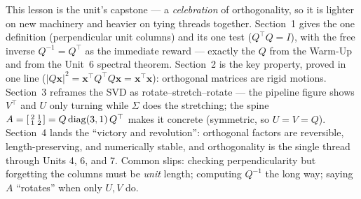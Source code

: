 \documentclass[10pt]{article}
\newcommand{\xx}{\mathbf{x}}
\newcommand{\T}{^{\top}}
\begin{document}
\begin{teachernote}
This lesson is the unit's capstone --- a \emph{celebration} of orthogonality, so it is lighter on new machinery
and heavier on tying threads together. Section~1 gives the one definition (perpendicular unit columns) and its
one test ($Q\T Q=I$), with the free inverse $Q^{-1}=Q\T$ as the immediate reward --- exactly the $Q$ from the
Warm-Up and from the Unit~6 spectral theorem. Section~2 is the key property, proved in one line
($|Q\xx|^2=\xx\T Q\T Q\xx=\xx\T\xx$): orthogonal matrices are rigid motions. Section~3 reframes the SVD as
rotate--stretch--rotate --- the pipeline figure shows $V\T$ and $U$ only turning while $\Sigma$ does the
stretching; the spine $A=\begin{bsmallmatrix} 2 & 1\\ 1 & 2 \end{bsmallmatrix}=Q\,\mathrm{diag}(3,1)\,Q\T$ makes it
concrete (symmetric, so $U=V=Q$). Section~4 lands the ``victory and revolution'': orthogonal factors are
reversible, length-preserving, and numerically stable, and orthogonality is the single thread through Units
4, 6, and 7. Common slips: checking perpendicularity but forgetting the columns must be \emph{unit} length;
computing $Q^{-1}$ the long way; saying $A$ ``rotates'' when only $U,V$ do.
\end{teachernote}
\end{document}
